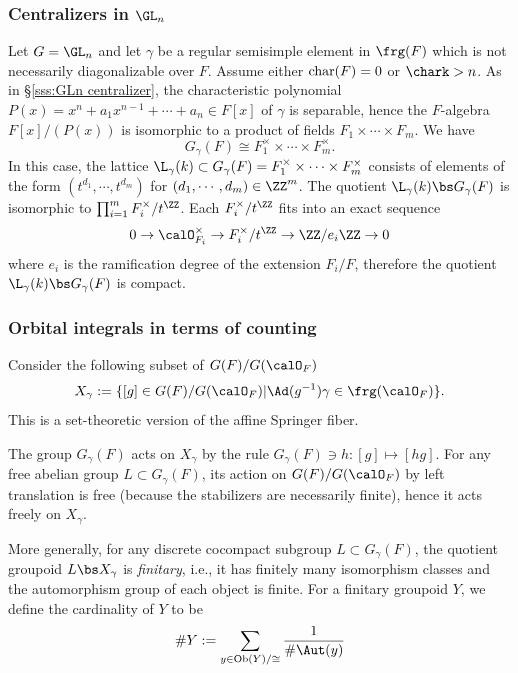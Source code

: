 \subsubsection{Centralizers in $\GL_{n}$}\label{sss:GLn orb} Let $G=\GL_{n}$ and let $\gamma$ be a regular semisimple element in $\frg(F)$ which is not necessarily diagonalizable over $F$. Assume either $\textup{char}(F)=0$ or $\chark>n$. As in \S\ref{sss:GLn centralizer}, the characteristic polynomial $P(x)=x^{n}+a_{1}x^{n-1}+\cdots+a_{n}\in F[x]$ of $\gamma$ is separable, hence the $F$-algebra $F[x]/(P(x))$ is isomorphic to a product of fields $F_{1}\times \cdots \times F_{m}$. We have
\begin{equation*}
G_{\gamma}(F)\cong F^{\times}_{1}\times\cdots\times F^{\times}_{m}.
\end{equation*}
In this case, the lattice $\L_{\gamma}(k)\subset G_{\gamma}(F)=F^{\times}_{1}\times\cdots\times F^{\times}_{m}$ consists of elements of the form $(t^{d_{1}},\cdots, t^{d_{m}})$ for $(d_{1},\cdots, d_{m})\in\ZZ^{m}$. The quotient $\L_{\gamma}(k)\bs G_{\gamma}(F)$ is isomorphic to $\prod_{i=1}^{m}F^{\times}_{i}/t^{\ZZ}$. Each $F^{\times}_{i}/t^{\ZZ}$ fits into an exact sequence
\begin{equation}\label{Fi seq}
0\to \calO^{\times}_{F_{i}}\to F^{\times}_{i}/t^{\ZZ}\to \ZZ/e_{i}\ZZ\to 0
\end{equation}
where $e_{i}$ is the ramification degree of the extension $F_{i}/F$, therefore the quotient $\L_{\gamma}(k)\bs G_{\gamma}(F)$ is compact.

\subsubsection{Orbital integrals in terms of counting}\label{sss:X gamma} Consider the following subset of $G(F)/G(\calO_{F})$
\begin{equation*}
X_{\gamma}:=\{[g]\in G(F)/G(\calO_{F})|\Ad(g^{-1})\gamma\in\frg(\calO_{F})\}.
\end{equation*}
This is a set-theoretic version of the affine Springer fiber. 

The group $G_{\gamma}(F)$ acts on $X_{\gamma}$ by the rule $G_{\gamma}(F)\ni h:[g]\mapsto[hg]$. For any free abelian group $L\subset G_{\gamma}(F)$, its action on $G(F)/G(\calO_{F})$ by left translation is free (because the stabilizers are necessarily finite), hence it acts freely on $X_{\gamma}$.

More generally, for any discrete cocompact subgroup $L\subset G_{\gamma}(F)$, the quotient groupoid $L\bs X_{\gamma}$ is {\em finitary}, i.e.,  it has finitely many isomorphism classes and the automorphism group of each object is finite. For a finitary groupoid $Y$, we define the cardinality of $Y$ to be 
\begin{equation}\label{card groupoid}
\#Y:=\sum_{y\in \textup{Ob}(Y)/\cong}\frac{1}{\#\Aut(y)}
\end{equation}


